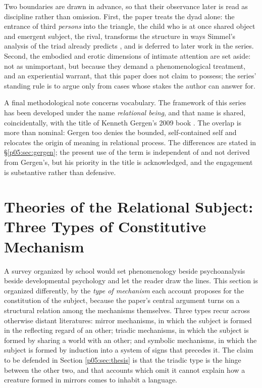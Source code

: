 Two boundaries are drawn in advance, so that their observance later is read as discipline rather than omission. First, the paper treats the dyad alone: the entrance of third \emph{persons} into the triangle, the child who is at once shared object and emergent subject, the rival, transforms the structure in ways Simmel's analysis of the triad already predicts \parencite{simmel1950}, and is deferred to later work in the series. Second, the embodied and erotic dimensions of intimate attention are set aside: not as unimportant, but because they demand a phenomenological treatment, and an experiential warrant, that this paper does not claim to possess; the series' standing rule is to argue only from cases whose stakes the author can answer for.

A final methodological note concerns vocabulary. The framework of this series has been developed under the name \emph{relational being}, and that name is shared, coincidentally, with the title of Kenneth Gergen's 2009 book \parencite{gergen2009}. The overlap is more than nominal: Gergen too denies the bounded, self-contained self and relocates the origin of meaning in relational process. The differences are stated in §\ref{p05:sec:gergen}; the present use of the term is independent of and not derived from Gergen's, but his priority in the title is acknowledged, and the engagement is substantive rather than defensive.

\section{Theories of the Relational Subject: Three Types of Constitutive Mechanism}
\label{p05:sec:survey}

A survey organized by school would set phenomenology beside psychoanalysis beside developmental psychology and let the reader draw the lines. This section is organized differently, by the \emph{type of mechanism} each account proposes for the constitution of the subject, because the paper's central argument turns on a structural relation among the mechanisms themselves. Three types recur across otherwise distant literatures: mirror mechanisms, in which the subject is formed in the reflecting regard of an other; triadic mechanisms, in which the subject is formed by sharing a world with an other; and symbolic mechanisms, in which the subject is formed by induction into a system of signs that precedes it. The claim to be defended in Section \ref{p05:sec:thesis} is that the triadic type is the hinge between the other two, and that accounts which omit it cannot explain how a creature formed in mirrors comes to inhabit a language.

